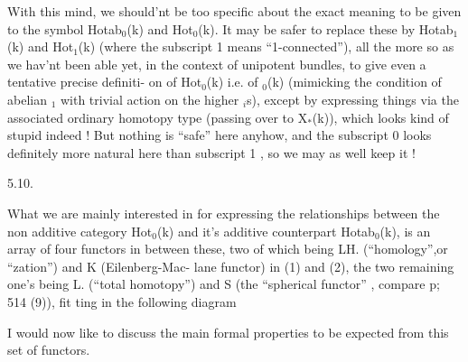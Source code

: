 With this  mind, we should'nt be too specific  about the exact meaning
to be given to the symbol Hotab$_0$(k) and Hot$_0$(k). It may be safer 
to replace these by Hotab$_1$(k) and Hot$_1$(k) (where the subscript 1 means
``1-connected''), all the more so as we hav'nt been able yet, in the
context of unipotent bundles, to give even a tentative precise definiti-%
on of Hot$_0$(k) i.e. of $_0$(k) (mimicking the condition of abelian  \hand{$\pi$}$_1$
with trivial action on the higher \hand{$\pi$}$_i$s), except by expressing things
via the associated ordinary homotopy type (passing over to X$_*$(k)), which
looks kind of stupid indeed ! But nothing is ``safe'' here anyhow, and
the subscript 0 looks definitely more natural here than subscript 1 ,
so we may as well keep it !

5.10.

What we are mainly interested in\hand{,} for expressing the relationships
between the non additive category Hot$_0$(k) and it's additive counterpart
Hotab$_0$(k), is an array of four functors \hand{\unsure{,}}in between these, two of
which being L\hand{$\widetilde{\phantom{H}}$}H. (``homology'',or ``zation'') and \hand{$\widetilde{\phantom{K}}$}K (Eilenberg-Mac-%
lane functor) in (1) and (2), the two remaining one's being L\hand{$\pi$}. (``total
homotopy'') and \hand{$\widetilde{\phantom{S}}$}S (the ``spherical functor'' , compare p; 514 (9)), fit%
ting in the following diagram


I would now like to discuss the main formal properties to be expected
from this set of functors.

